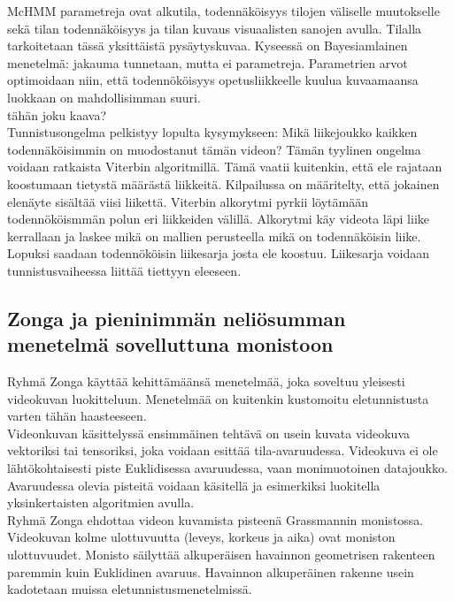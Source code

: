 McHMM parametreja ovat alkutila, todennäköisyys tilojen väliselle muutokselle sekä tilan todennäköisyys ja tilan kuvaus visuaalisten sanojen avulla. 
Tilalla tarkoitetaan tässä yksittäistä pysäytyskuvaa. Kyseessä on Bayesiamlainen menetelmä: jakauma tunnetaan, mutta ei parametreja.
Parametrien arvot optimoidaan niin, että todennököisyys opetusliikkeelle kuulua kuvaamaansa luokkaan on mahdollisimman suuri.\\
tähän joku kaava? \\

Tunnistusongelma pelkistyy lopulta kysymykseen: Mikä liikejoukko kaikken todennäköisimmin on muodostanut tämän videon?
Tämän tyylinen ongelma voidaan ratkaista Viterbin algoritmillä. Tämä vaatii kuitenkin, että ele rajataan koostumaan tietystä määrästä liikkeitä.
Kilpailussa on määritelty, että jokainen elenäyte sisältää viisi liikettä.
Viterbin alkorytmi pyrkii löytämään todennököismmän polun eri liikkeiden välillä. Alkorytmi käy videota läpi liike kerrallaan ja laskee mikä
on mallien perusteella mikä on todennäköisin liike. Lopuksi saadaan todennököisin liikesarja josta ele koostuu.
Liikesarja voidaan tunnistusvaiheessa liittää tiettyyn eleeseen. \citep {6239185}\\ 


\subsection{Zonga ja pieninimmän neliösumman menetelmä sovelluttuna monistoon}
Ryhmä Zonga käyttää kehittämäänsä menetelmää, joka soveltuu yleisesti videokuvan luokitteluun. 
Menetelmää on kuitenkin kustomoitu eletunnistusta varten tähän haasteeseen.\\

Videonkuvan käsittelyssä ensimmäinen tehtävä on usein kuvata videokuva vektoriksi tai tensoriksi, joka voidaan esittää tila-avaruudessa. 
Videokuva ei ole lähtökohtaisesti piste Euklidisessa avaruudessa, vaan monimuotoinen datajoukko. Avaruudessa olevia pisteitä voidaan käsitellä
ja esimerkiksi luokitella yksinkertaisten algoritmien avulla.\\

Ryhmä Zonga ehdottaa videon kuvamista pisteenä Grassmannin monistossa. Videokuvan kolme ulottuvuutta (leveys, korkeus ja aika) ovat moniston ulottuvuudet.
Monisto säilyttää alkuperäisen havainnon geometrisen rakenteen paremmin kuin Euklidinen avaruus.
Havainnon alkuperäinen rakenne usein kadotetaan muissa eletunnistusmenetelmissä. \\

